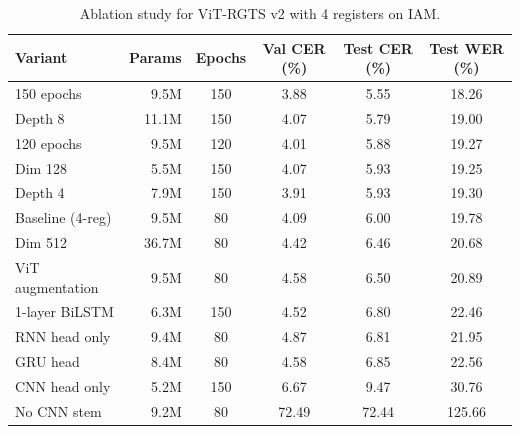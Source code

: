 \begin{table}[t]
\centering
\caption{Ablation study for ViT-RGTS v2 with 4 registers on IAM.}
\label{tab:ablations}
\begin{tabular}{lrcccc}
\toprule
Variant & Params & Epochs & Val CER (\%) & Test CER (\%) & Test WER (\%) \\
\midrule
150 epochs & 9.5M & 150 & 3.88 & 5.55 & 18.26 \\
Depth 8 & 11.1M & 150 & 4.07 & 5.79 & 19.00 \\
120 epochs & 9.5M & 120 & 4.01 & 5.88 & 19.27 \\
Dim 128 & 5.5M & 150 & 4.07 & 5.93 & 19.25 \\
Depth 4 & 7.9M & 150 & 3.91 & 5.93 & 19.30 \\
Baseline (4-reg) & 9.5M & 80 & 4.09 & 6.00 & 19.78 \\
Dim 512 & 36.7M & 80 & 4.42 & 6.46 & 20.68 \\
ViT augmentation & 9.5M & 80 & 4.58 & 6.50 & 20.89 \\
1-layer BiLSTM & 6.3M & 150 & 4.52 & 6.80 & 22.46 \\
RNN head only & 9.4M & 80 & 4.87 & 6.81 & 21.95 \\
GRU head & 8.4M & 80 & 4.58 & 6.85 & 22.56 \\
CNN head only & 5.2M & 150 & 6.67 & 9.47 & 30.76 \\
No CNN stem & 9.2M & 80 & 72.49 & 72.44 & 125.66 \\
\bottomrule
\end{tabular}
\end{table}
